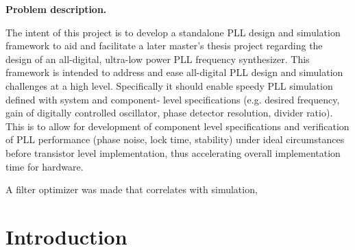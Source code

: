 	\pagebreak
	\thispagestyle{nohdr}
	\null\pagebreak
	\thispagestyle{nohdr}
	\Huge\textbf{Problem description.}\\
	\vspace{1em}
	\large\fontfamily{\rmdefault}\selectfont 
	
	The intent of this project is to develop a standalone PLL design and simulation framework to aid and facilitate a later master's thesis project regarding the design of an all-digital, ultra-low power PLL frequency synthesizer. This framework is intended to address and ease all-digital PLL design and simulation challenges at a high level. Specifically it should enable speedy PLL simulation defined with system and component- level specifications (e.g. desired frequency, gain of digitally controlled oscillator, phase detector resolution, divider ratio). This is to allow for development of component level specifications and verification of PLL performance (phase noise, lock time, stability) under ideal circumstances before transistor level implementation, thus accelerating overall implementation time for hardware.

	A filter optimizer was made that correlates with simulation, 

	\fontfamily{\sfdefault}\selectfont 
	\thispagestyle{nohdr}
	\null\pagebreak
	\thispagestyle{nohdr}
	\null\pagebreak
	\tableofcontents
	\pagebreak
	\listoffigures
	\listoftables


	\fontfamily{\rmdefault}\selectfont 
	

	\pagebreak
	\FloatBarrier

	\section{Introduction}\label{intro}
	
	\pagebreak
	\FloatBarrier

